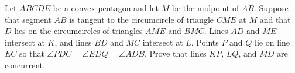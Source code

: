 Let $ABCDE$ be a convex pentagon and let $M$ be the midpoint of $AB$. Suppose that segment $AB$ is tangent to the circumcircle of triangle $CME$ at $M$ and that $D$ lies on the circumcircles of triangles $AME$ and $BMC$. Lines $AD$ and $ME$ intersect at $K$, and lines $BD$ and $MC$ intersect at $L$. Points $P$ and $Q$ lie on line $EC$ so that $\angle PDC = \angle EDQ = \angle ADB$. Prove that lines $KP$, $LQ$, and $MD$ are concurrent.
